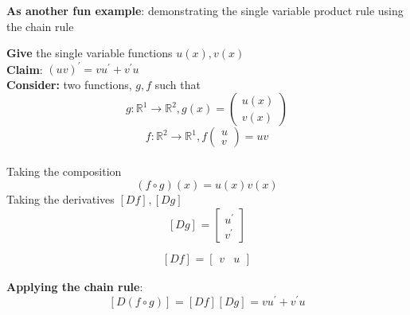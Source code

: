 \begin{framed}
\textbf{As another fun example}: demonstrating the single variable product rule using the chain rule

\textbf{Give} the single variable functions $u(x), v(x)$  \\

\textbf{Claim}: $(u v) ^{\prime} = vu ^{\prime} + v ^{\prime}u$ \\

\textbf{Consider:} two functions, $g, f$ such that  \[
  g : \mathbb{R}^1 \to \mathbb{R}^2, g(x) = \begin{pmatrix} u(x) \\ v(x) \end{pmatrix} 
\]
\[
  f: \mathbb{R}^2 \to \mathbb{R}^1, f \begin{pmatrix} u \\ v \end{pmatrix} = uv
\]  \\

Taking the composition 
\[
   (f \circ g)(x) = u(x)v(x)
\] 
Taking the derivatives $\left[ D f \right]_{} , \left[ D g \right]_{}$ \[
  \left[ D g \right]_{}  = \begin{bmatrix} 
    u ^{\prime} \\ v ^{\prime}  
  \end{bmatrix}
\] 

\[
  \left[ D f \right]_{} = \begin{bmatrix} 
     v & u
  \end{bmatrix}
\] 

\textbf{Applying the chain rule}: \[
  \left[ D (f \circ g) \right]_{} = \left[ D f \right]_{} \left[ D g \right]_{} = vu ^{\prime} + v ^{\prime} u
\] 
\end{framed}

